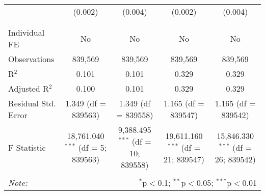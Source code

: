 \documentclass[
]{article}
\begin{document}
\begin{table}[!htbp]
{\begin{tabular}{@{\extracolsep{5pt}}lcccc}
  & (0.002) & (0.004) & (0.002) & (0.004) \\ 
  & & & & \\ 
\hline \\[-1.8ex] 
Individual FE & No & No & No & No \\ 
Observations & 839,569 & 839,569 & 839,569 & 839,569 \\ 
R$^{2}$ & 0.101 & 0.101 & 0.329 & 0.329 \\ 
Adjusted R$^{2}$ & 0.100 & 0.101 & 0.329 & 0.329 \\ 
Residual Std. Error & 1.349 (df = 839563) & 1.349 (df = 839558) & 1.165 (df = 839547) & 1.165 (df = 839542) \\ 
F Statistic & 18,761.040$^{***}$ (df = 5; 839563) & 9,388.495$^{***}$ (df = 10; 839558) & 19,611.160$^{***}$ (df = 21; 839547) & 15,846.330$^{***}$ (df = 26; 839542) \\ 
\hline 
\hline \\[-1.8ex] 
\textit{Note:}  & \multicolumn{4}{r}{$^{*}$p$<$0.1; $^{**}$p$<$0.05; $^{***}$p$<$0.01} \\ 
\end{tabular}
} 
\end{table} 
\newpage
\end{document}
